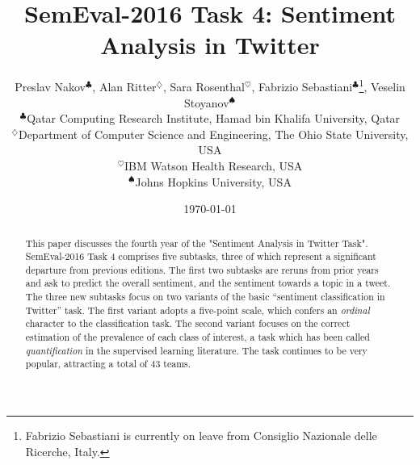 \documentclass[11pt,letterpaper]{article}
\title{SemEval-2016 Task 4: Sentiment Analysis in Twitter}
\author{Preslav Nakov$^{\clubsuit}$, Alan Ritter$^{\diamondsuit}$, Sara Rosenthal$^{\heartsuit}$, Fabrizio Sebastiani$^{\clubsuit}$\thanks{\hspace{0.5em}Fabrizio Sebastiani is currently on leave from Consiglio Nazionale delle Ricerche, Italy.}, Veselin Stoyanov$^{\spadesuit}$ \\
$^{\clubsuit}$Qatar Computing Research Institute,
Hamad bin Khalifa University, Qatar \\
$^{\diamondsuit}$Department of Computer Science and Engineering, The Ohio State University, USA \\
$^{\heartsuit}$IBM Watson Health Research, USA \\
$^{\spadesuit}$Johns Hopkins University, USA}
\date{\today}
\newif\ifdraft
\newcommand{\preslav}[1]{\ifdraft{\textcolor{blue}{[Preslav]: {#1}}}\else{\vspace{0ex}}\fi}
\newcommand{\alan}[1]{\ifdraft{\textcolor{red}{[Alan]: {#1}}}\else{\vspace{0ex}}\fi}
\newcommand{\sara}[1]{\ifdraft{\textcolor{violet}{[Sara]: {#1}}}\else{\vspace{0ex}}\fi}
\newcommand{\fabrizio}[1]{\ifdraft{\textcolor{cyan}{[Fabrizio]: {#1}}}\else{\vspace{0ex}}\fi}
\newcommand{\veselin}[1]{\ifdraft{\textcolor{brown}{[Veselin]: {#1}}}\else{\vspace{0ex}}\fi}
\begin{document}
\maketitle


\begin{abstract}
  This paper discusses the fourth year of the "Sentiment Analysis in Twitter Task". %
  SemEval-2016 Task 4 comprises five
  subtasks, three of which represent a significant departure from
  previous editions. The first two subtasks are reruns from prior years and ask to predict the overall sentiment, and the sentiment towards a topic in a tweet. The three new subtasks focus on two variants of the basic ``sentiment classification
  in Twitter'' task. %
  The first variant adopts a five-point scale, which confers
  an \textit{ordinal} character to the classification task.  The
  second variant focuses on the correct estimation of the prevalence
  of each class of interest, a task which has been called
  \textit{quantification} in the supervised learning literature. %
  The task continues to be very popular, attracting a total of 43 teams.
\end{abstract}




\end{document}
